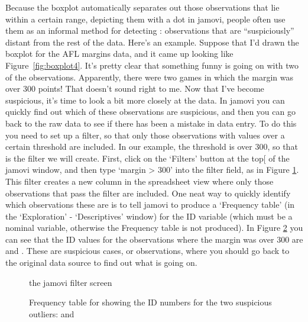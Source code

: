 Because the boxplot automatically separates out those observations that lie within a certain range, depicting them with a dot in jamovi, people often use them as an informal method for detecting : observations that are ``suspiciously'' distant from the rest of the data. Here's an example. Suppose that I'd drawn the boxplot for the AFL margins data, and it came up looking like Figure~\ref{fig:boxplot4}. It's pretty clear that something funny is going on with two of the observations. Apparently, there were two games in which the margin was over 300 points! That doesn't sound right to me. Now that I've become suspicious, it's time to look a bit more closely at the data. In jamovi you can quickly find out which of these observations are suspicious, and then you can go back to the raw data to see if there has been a mistake in data entry. To do this you need to set up a filter, so that only those observations with values over a certain threshold are included. In our example, the threshold is over 300, so that is the filter we will create. First, click on the `Filters' button at the top[ of the jamovi window, and then type `margin > 300' into the filter field, as in Figure \ref{fig:filter1}. This filter creates a new column in the spreadsheet view where only those observations that pass the filter are included. One neat way to quickly identify which observations these are is to tell jamovi to produce a `Frequency table' (in the `Exploration' - `Descriptives' window) for the ID variable (which must be a nominal variable, otherwise the Frequency table is not produced). In Figure \ref{fig:filter2} you can see that the ID values for the observations where the margin was over 300 are  and . These are suspicious cases, or observations, where you should go back to the original data source to find out what is going on.


\begin{figure}[h]
\begin{center}
\caption{the jamovi filter screen}
\label{fig:filter1}
\HR
\end{center}
\end{figure}

\begin{figure}[h!!]
\begin{center}
\caption{Frequency table for  showing the ID numbers for the two suspicious outliers:  and }
\label{fig:filter2}
\HR
\end{center}
\end{figure}


